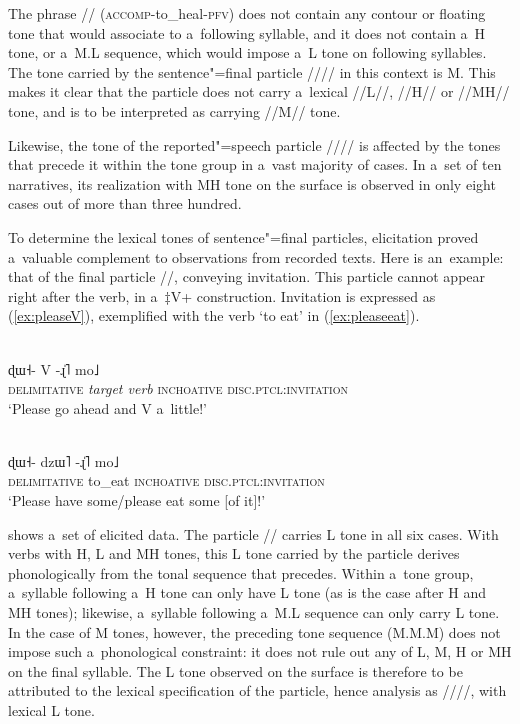 The phrase
// ({\textsc{accomp}}-to\_heal-{\textsc{pfv}}) does not contain any contour or
floating tone that would associate to a~following syllable, and it does not contain a~H tone,
or a~M.L sequence, which would impose a~L tone on following syllables. The tone carried by the
sentence"=final particle //// in this context is M. This makes it clear that the particle does not carry
a~lexical //L//, //H// or \mbox{//MH//} tone, and is to be interpreted as carrying \mbox{//M//} tone.

Likewise, the tone of the reported"=speech particle //// is affected by the tones that
precede it within the tone group in a~vast majority of cases. In a~set of ten narratives, its
realization with MH tone on the surface is observed in only eight cases out of more than three
hundred. 

To determine the lexical tones of sentence"=final particles, elicitation proved a~valuable complement to
observations from recorded texts. Here is an~example: that of the final particle //,
conveying invitation. This particle cannot appear right after the verb, in a~$\ddagger${\kern2pt}V+
construction. Invitation is expressed as (\ref{ex:pleaseV}), exemplified with the verb ‘to eat’ in (\ref{ex:pleaseeat}). 

\begin{exe}
	\ex
	\label{ex:pleaseV}
	\\
	\gll ɖɯ˧-		V		-ɻ̍˥	mo˩\\
	\textsc{delimitative}		{\textit{target verb}}	\textsc{inchoative}		\textsc{disc.ptcl:invitation}\\
	\glt ‘Please go ahead and V a~little!’
\end{exe}

\begin{exe}
	\ex
	\label{ex:pleaseeat}
	\\
	\gll ɖɯ˧-		dzɯ˥		-ɻ̍˥	mo˩\\
	\textsc{delimitative}		to\_eat	\textsc{inchoative}		\textsc{disc.ptcl:invitation}\\
	\glt ‘Please have some/please eat some [of it]!’
\end{exe}

 shows a~set of elicited data. The particle // carries L tone in all six cases. With verbs with H, L and MH tones, this
L tone carried by the particle derives phonologically from the tonal sequence that precedes. Within
a~tone group, a~syllable following a~H tone can only have L tone (as is the case after H and MH
tones); likewise, a~syllable following a~M.L sequence can only carry L tone. In the case of M tones,
however, the preceding tone sequence (M.M.M) does not impose such a~phonological constraint: it does not rule out any of L, M, H or MH on the final syllable. The L tone observed on the surface is therefore
to be attributed to the lexical specification of the particle, hence analysis as ////, with lexical L tone.

